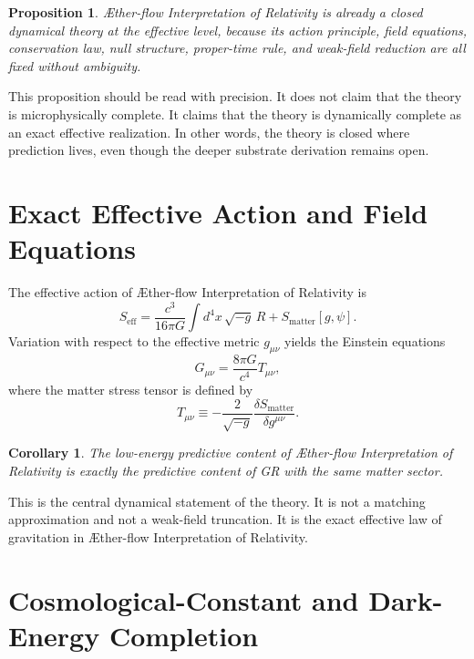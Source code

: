 \documentclass[11pt]{article}
\newcommand{\Aflow}{\AE{}ther-flow}
\newcommand{\TheoryName}{\Aflow{} Interpretation of Relativity}
\newtheorem{proposition}{Proposition}
\newtheorem{corollary}{Corollary}
\begin{document}
\begin{proposition}
\TheoryName{} is already a closed dynamical theory at the effective level, because its action principle, field equations, conservation law, null structure, proper-time rule, and weak-field reduction are all fixed without ambiguity.
\end{proposition}

This proposition should be read with precision. It does not claim that the theory is microphysically complete. It claims that the theory is dynamically complete as an exact effective realization. In other words, the theory is closed where prediction lives, even though the deeper substrate derivation remains open.

\section{Exact Effective Action and Field Equations}

The effective action of \TheoryName{} is
\begin{equation}
S_{\mathrm{eff}}
=
\frac{c^3}{16\pi G}\int d^4x\,\sqrt{-g}\,R
+
S_{\mathrm{matter}}[g,\psi].
\label{eq:SA}
\end{equation}
Variation with respect to the effective metric \(g_{\mu\nu}\) yields the Einstein equations
\begin{equation}
G_{\mu\nu}=\frac{8\pi G}{c^4}T_{\mu\nu},
\label{eq:einstein}
\end{equation}
where the matter stress tensor is defined by
\begin{equation}
T_{\mu\nu}
\equiv
-\frac{2}{\sqrt{-g}}
\frac{\delta S_{\mathrm{matter}}}{\delta g^{\mu\nu}}.
\label{eq:stress}
\end{equation}

\begin{corollary}
The low-energy predictive content of \TheoryName{} is exactly the predictive content of GR with the same matter sector.
\end{corollary}

This is the central dynamical statement of the theory. It is not a matching approximation and not a weak-field truncation. It is the exact effective law of gravitation in \TheoryName{}.

\section{Cosmological-Constant and Dark-Energy Completion}
\end{document}
